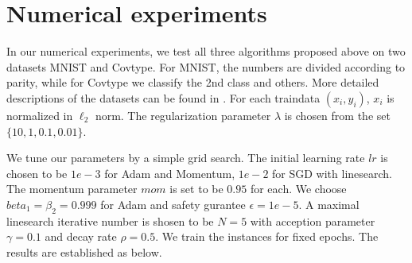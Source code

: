 \documentclass{article}
\begin{document}
\section{Numerical experiments}
In our numerical experiments, we test all three algorithms proposed above on two datasets MNIST and Covtype. For MNIST, the numbers are divided according to parity, while for Covtype we classify the 2nd class and others. More detailed descriptions of the datasets can be found in \cite{bollapragada2019exact}. For each traindata $(x_i,y_i)$, $x_i$ is normalized in $\ell_2$ norm. The regularization parameter $\lambda$ is chosen from the set $\{10,1,0.1,0.01\}$.

We tune our parameters by a simple grid search. The initial learning rate $lr$ is chosen to be $1e-3$ for Adam and Momentum, $1e-2$ for SGD with linesearch. The momentum parameter $mom$ is set to be $0.95$ for each. We choose $beta_1=\beta_2=0.999$ for Adam and safety gurantee $\epsilon=1e-5$. A maximal linesearch iterative number is shosen to be $N=5$ with acception parameter $\gamma=0.1$ and decay rate $\rho=0.5$. We train the instances for fixed epochs. The results are established as below.
\end{document}
